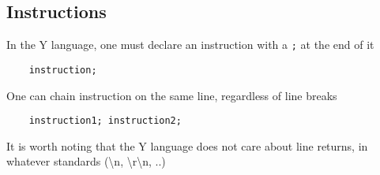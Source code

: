\subsection{Instructions}

In the Y language, one must declare an instruction with a \texttt{;} at the end
of it

\begin{lstlisting}
    instruction;
\end{lstlisting}

One can chain instruction on the same line, regardless of line breaks

\begin{lstlisting}
    instruction1; instruction2;
\end{lstlisting}

It is worth noting that the Y language does not care about line returns,
in whatever standards (\textbackslash n, \textbackslash r\textbackslash n, ..)
